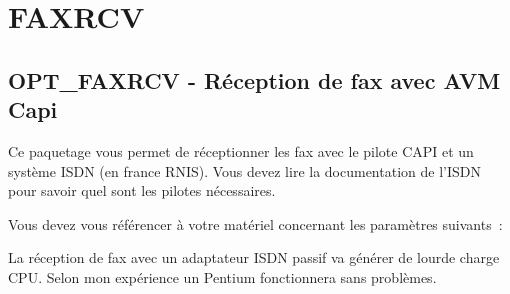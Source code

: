 {
\section{FAXRCV}
}

\subsection{OPT\_FAXRCV - Réception de fax avec AVM Capi}

   Ce paquetage vous permet de réceptionner les fax avec le pilote CAPI et
   un système ISDN (en france RNIS). Vous devez lire la documentation de
   l'ISDN pour savoir quel sont les pilotes nécessaires.

  Vous devez vous référencer à votre matériel concernant les paramètres suivants~:

  La réception de fax avec un adaptateur ISDN passif va générer de lourde charge
  CPU. Selon mon expérience un Pentium fonctionnera sans problèmes.

